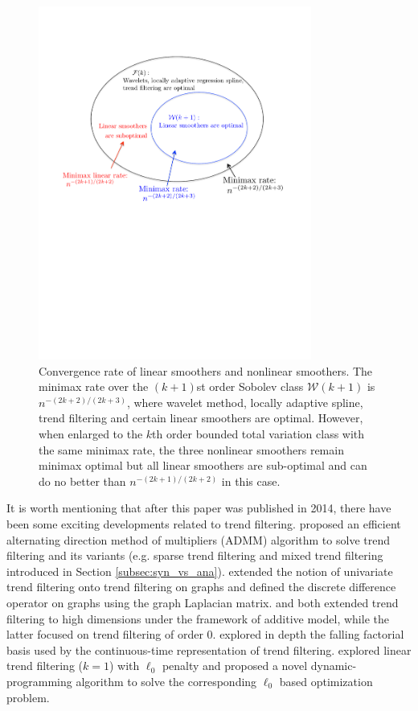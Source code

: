 \documentclass[a4paper]{article}
\renewcommand{\cal}{\mathcal}
\begin{document}
\begin{figure}[t!]
\centering
\includegraphics[width = 0.8\textwidth]{Figures/diagram.pdf}
\caption{Convergence rate of linear smoothers and nonlinear smoothers. The minimax rate over the $(k+1)$st order Sobolev class $\cal{W}(k+1)$ is $n^{-(2k+2)/(2k+3)}$, where wavelet method, locally adaptive spline, trend filtering and certain linear smoothers are optimal. However, when enlarged to the $k$th order bounded total variation class with the same minimax rate, the three nonlinear smoothers remain minimax optimal but all linear smoothers are sub-optimal and can do no better than $n^{-(2k+1)/(2k+2)}$ in this case.} 
\label{fig:diagram}
\end{figure}
 
It is worth mentioning that after this paper was published in 2014, there have been some exciting developments related to trend filtering. \cite{ramdas2016fast} proposed an efficient alternating direction method of multipliers (ADMM) algorithm to solve trend filtering and its variants (e.g. sparse trend filtering and mixed trend filtering introduced in Section \ref{subsec:syn_vs_ana}). \cite{wang2016trend} extended the notion of univariate trend filtering onto trend filtering on graphs and defined the discrete difference operator on graphs using the graph Laplacian matrix. \cite{sadhanala2017additive} and \cite{petersen2014fused} both extended trend filtering to high dimensions under the framework of additive model, while the latter focused on trend filtering of order $0$. \cite{wang2014falling} explored in depth the falling factorial basis used by the continuous-time representation of trend filtering. \cite{maidstone2017detecting} explored linear trend filtering ($k =1$) with $\ell_0$ penalty and proposed a novel dynamic-programming algorithm to solve the corresponding $\ell_0$ based optimization problem. 
\end{document}
